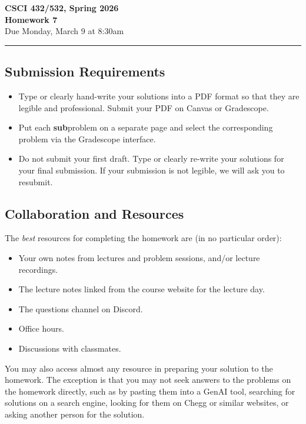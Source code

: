 \documentclass[11pt]{article}
\begin{document}
\begin{center}
\Large\textbf{CSCI 432/532, Spring 2026}%
\\
\LARGE\textbf{Homework 7}%
\\[0.5ex]
\large Due Monday, March 9 at 8:30am
\end{center}

\bigskip
\hrule
\bigskip

\subsection*{Submission Requirements}
\begin{itemize}
    \item Type or clearly hand-write your solutions into a PDF format so that they are legible and professional. Submit your PDF on Canvas or Gradescope. 
	\item Put each \textbf{sub}problem on a separate page and select the corresponding problem via the Gradescope interface.
    \item Do not submit your first draft. Type or clearly re-write your solutions for your final submission. If your submission is not legible, we will ask you to resubmit.
\end{itemize}

\subsection*{Collaboration and Resources}

The \emph{best} resources for completing the homework are (in no particular order):
\begin{itemize}
	\item Your own notes from lectures and problem sessions, and/or lecture recordings.
	\item The lecture notes linked from the course website for the lecture day.
	\item The questions channel on Discord.
	\item Office hours.
	\item Discussions with classmates.
\end{itemize}
You may also access almost any resource in preparing your solution to the
homework. The exception is that you may not seek answers to the problems on the
homework directly, such as by pasting them into a GenAI tool, searching for
solutions on a search engine, looking for them on Chegg or similar websites, or
asking another person for the solution.
\end{document}
